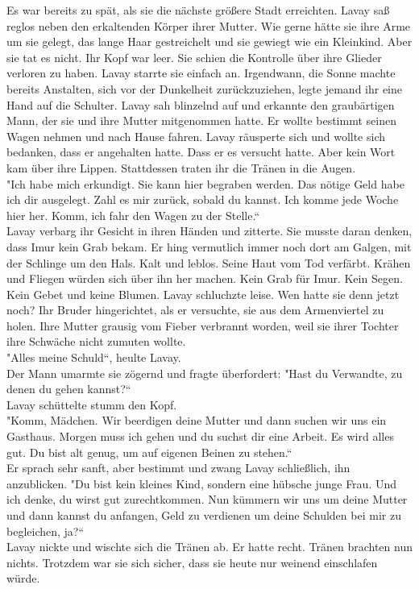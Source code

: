 Es war bereits zu spät, als sie die nächste größere Stadt erreichten. Lavay saß reglos neben den 
erkaltenden Körper ihrer Mutter. Wie gerne hätte sie ihre Arme um sie gelegt, das lange Haar 
gestreichelt und sie gewiegt wie ein Kleinkind. Aber sie tat es nicht. Ihr Kopf war leer. Sie 
schien die Kontrolle über ihre Glieder verloren zu haben. Lavay starrte sie einfach an.
Irgendwann, die Sonne machte bereits Anstalten, sich vor der Dunkelheit zurückzuziehen, legte 
jemand ihr eine Hand auf die Schulter. Lavay sah blinzelnd auf und erkannte den graubärtigen Mann, 
der sie und ihre Mutter mitgenommen hatte. Er wollte bestimmt seinen Wagen nehmen und nach Hause 
fahren. Lavay räusperte sich und wollte sich bedanken, dass er angehalten hatte. Dass er es 
versucht hatte. Aber kein Wort kam über ihre Lippen. Stattdessen traten ihr die Tränen in die 
Augen.\\
"Ich habe mich erkundigt. Sie kann hier begraben werden. Das nötige Geld habe ich dir ausgelegt. 
Zahl es mir zurück, sobald du kannst. Ich komme jede Woche hier her. Komm, ich fahr den Wagen zu 
der Stelle.``\\
Lavay verbarg ihr Gesicht in ihren Händen und zitterte. Sie musste daran denken, dass Imur kein 
Grab bekam. Er hing vermutlich immer noch dort am Galgen, mit der Schlinge um den Hals. Kalt und 
leblos. Seine Haut vom Tod verfärbt. Krähen und Fliegen würden sich über ihn her machen. Kein Grab 
für Imur. Kein Segen. Kein Gebet und keine Blumen. Lavay schluchzte leise. Wen hatte sie denn jetzt 
noch? Ihr Bruder hingerichtet, als er versuchte, sie aus dem Armenviertel zu holen. Ihre Mutter 
grausig vom Fieber verbrannt worden, weil sie ihrer Tochter ihre Schwäche nicht zumuten wollte.\\
"Alles meine Schuld``, heulte Lavay.\\
Der Mann umarmte sie zögernd und fragte überfordert: "Hast du Verwandte, zu denen du gehen 
kannst?``\\
Lavay schüttelte stumm den Kopf. \\
"Komm, Mädchen. Wir beerdigen deine Mutter und dann suchen wir uns ein Gasthaus. Morgen muss ich 
gehen und du suchst dir eine Arbeit. Es wird alles gut. Du bist alt genug, um auf eigenen Beinen zu 
stehen.``\\
Er sprach sehr sanft, aber bestimmt und zwang Lavay schließlich, ihn anzublicken. "Du bist kein 
kleines Kind, sondern eine hübsche junge Frau. Und ich denke, du wirst gut zurechtkommen. Nun 
kümmern wir uns um deine Mutter und dann kannst du anfangen, Geld zu verdienen um deine Schulden 
bei mir zu begleichen, ja?``\\
Lavay nickte und wischte sich die Tränen ab. Er hatte recht. Tränen brachten nun nichts. Trotzdem 
war sie sich sicher, dass sie heute nur weinend einschlafen würde.\\


